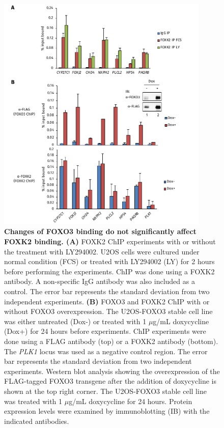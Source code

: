 \begin{figure}[!h]
    \centering
    \includegraphics[width=0.9\textwidth]{chapter3/figures_foxo3/fig50.pdf}
    \caption[Changes of FOXO3 binding do not significantly affect FOXK2 binding]{\textbf{Changes of FOXO3 binding do not significantly affect FOXK2 binding. (A)} FOXK2 ChIP experiments with or without the treatment with LY294002. U2OS cells were cultured under normal condition (FCS) or treated with LY294002 (LY) for 2 hours before performing the experiments. ChIP was done using a FOXK2 antibody. A non-specific IgG antibody was also included as a control. The error bar represents the standard deviation from two independent experiments. \textbf{(B)} FOXO3 and FOXK2 ChIP with or without FOXO3 overexpression. The U2OS-FOXO3 stable cell line was either untreated (Dox-) or treated with 1 $\mu$g/mL doxycycline (Dox+) for 24 hours before experiments. ChIP experiments were done using a FLAG antibody (top) or a FOXK2 antibody (bottom). The \textit{PLK1} locus was used as a negative control region. The error bar represents the standard deviation from two independent experiments. Western blot analysis showing the overexpression of the FLAG-tagged FOXO3 transgene after the addition of doxycycline is shown at the top right corner. The U2OS-FOXO3 stable cell line was treated with 1 $\mu$g/mL doxycycline for 24 hours. Protein expression levels were examined by immunoblotting (IB) with the indicated antibodies.}
    \label{fig:fig50}
\end{figure}

